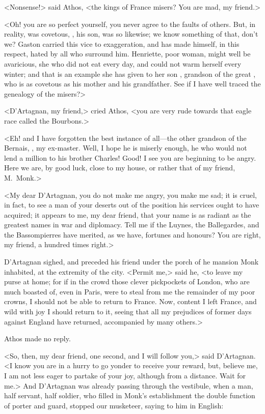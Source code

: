 <Nonsense!> said Athos, <the kings of France misers? You are mad, my friend.>

<Oh! you are so perfect yourself, you never agree to the faults of others. But, in reality,  was covetous, , his son, was so likewise; we know something of that, don't we? Gaston carried this vice to exaggeration, and has made himself, in this respect, hated by all who surround him. Henriette, poor woman, might well be avaricious, she who did not eat every day, and could not warm herself every winter; and that is an example she has given to her son , grandson of the great , who is as covetous as his mother and his grandfather. See if I have well traced the genealogy of the misers?>

<D'Artagnan, my friend,> cried Athos, <you are very rude towards that eagle race called the Bourbons.>

<Eh! and I have forgotten the best instance of all—the other grandson of the Bernais, , my ex-master. Well, I hope he is miserly enough, he who would not lend a million to his brother Charles! Good! I see you are beginning to be angry. Here we are, by good luck, close to my house, or rather that of my friend, M.~Monk.>

<My dear D'Artagnan, you do not make me angry, you make me sad; it is cruel, in fact, to see a man of your deserts out of the position his services ought to have acquired; it appears to me, my dear friend, that your name is as radiant as the greatest names in war and diplomacy. Tell me if the Luynes, the Ballegardes, and the Bassompierres have merited, as we have, fortunes and honours? You are right, my friend, a hundred times right.>

D'Artagnan sighed, and preceded his friend under the porch of he mansion Monk inhabited, at the extremity of the city. <Permit me,> said he, <to leave my purse at home; for if in the crowd those clever pickpockets of London, who are much boasted of, even in Paris, were to steal from me the remainder of my poor crowns, I should not be able to return to France. Now, content I left France, and wild with joy I should return to it, seeing that all my prejudices of former days against England have returned, accompanied by many others.>

Athos made no reply.

<So, then, my dear friend, one second, and I will follow you,> said D'Artagnan. <I know you are in a hurry to go yonder to receive your reward, but, believe me, I am not less eager to partake of your joy, although from a distance. Wait for me.> And D'Artagnan was already passing through the vestibule, when a man, half servant, half soldier, who filled in Monk's establishment the double function of porter and guard, stopped our musketeer, saying to him in English:

